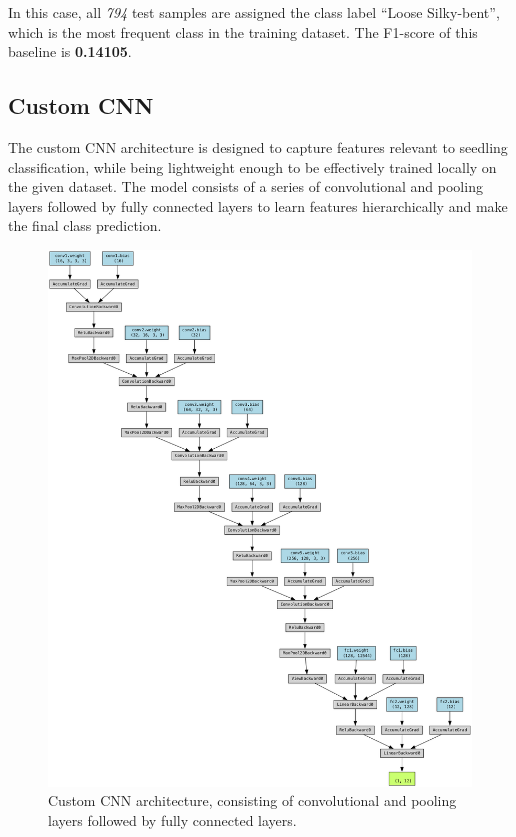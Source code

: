 In this case, all \textit{794} test samples are assigned the class label ``Loose Silky-bent'', which is the most frequent class in the training dataset. The F1-score of this baseline is \textbf{0.14105}.

\subsection{Custom CNN}

The custom CNN architecture is designed to capture features relevant to seedling classification, while being lightweight enough to be effectively trained locally on the given dataset. The model consists of a series of convolutional and pooling layers followed by fully connected layers to learn features hierarchically and make the final class prediction.

\begin{figure}[htbp]
    \centerline{\includegraphics[width=0.9\linewidth]{../../resources/custom_cnn/architecture.png}}
    \caption{Custom CNN architecture, consisting of convolutional and pooling layers followed by fully connected layers.}
    \label{fig:custom-cnn-architecture}
\end{figure}

